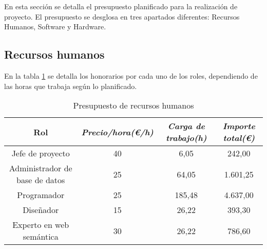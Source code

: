 En esta sección se detalla el presupuesto planificado para la realización de proyecto. El presupuesto se desglosa en tres apartados diferentes: Recursos Humanos, Software y Hardware.

\subsection{Recursos humanos}

En la tabla \ref{tab:budget-human} se detalla los honorarios por cada uno de los roles, dependiendo de las horas que trabaja según lo planificado.

\begin{table}[htp]
	\centering
	\caption{Presupuesto de recursos humanos}\label{tab:budget-human}
	\begin{tabular}{cccc}
		\toprule
    	\textbf{Rol} & \emph{Precio/hora(\euro/h)} & \emph{Carga de trabajo(h)} & \emph{Importe total(\euro)}\\
    	\midrule
    	Jefe de proyecto				&	40			&	6,05 					& 	242,00\\
		Administrador de base de datos	&	25			&	64,05					&	1.601,25\\
		Programador						&	25			&	185,48					&	4.637,00\\
		Diseñador						&	15			&	26,22					&	393,30\\
		Experto en web semántica		&	30			&	26,22					&	786,60\\
    	\bottomrule
    \end{tabular}
\end{table}